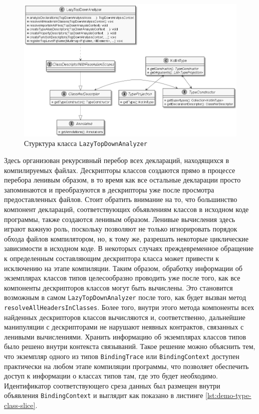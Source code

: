 \begin{figure}[htbp]
    \centering
    \includegraphics[width=\textwidth]{resources/06/12_class_descriptor.png}
    \caption{Стурктура класса \lstinline{LazyTopDownAnalyzer}}
    \label{fig:lazy-top-down-analyzer}
\end{figure}

Здесь организован рекурсивный перебор всех деклараций, находящихся в компилируемых файлах. Дескрипторы классов создаются прямо в процессе перебора ленивым образом, в то время как все остальные декларации просто запоминаются и преобразуются в дескрипторы уже после просмотра предоставленных файлов. Стоит обратить внимание на то, что большинство компонент деклараций, соответствующих объявлениям классов в исходном коде программы, также создаются ленивым образом. Ленивые вычисления здесь играют важную роль, поскольку позволяют не только игнорировать порядок обхода файлов компилятором, но, к тому же, разрешать некоторые циклические зависимости в исходном коде. В некоторых случаях преждевременное обращение к определенным составляющим дескриптора класса может привести к исключению на этапе компиляции. Таким образом, обработку информации об экземплярах классов типов целесообразно проводить уже после того, как все компоненты дескрипторов классов могут быть вычислены. Это становится возможным в самом \lstinline{LazyTopDownAnalyzer} после того, как будет вызван метод \lstinline{resolveAllHeadersInClasses}. Более того, внутри этого метода компоненты всех найденных дескрипторов классов вычисляются и, соответственно, дальнейшие манипуляции с дескрипторами не нарушают неявных контрактов, связанных с ленивыми вычислениями. Хранить информацию об экземплярах классов типов было решено внутри контекста связываний. Такое решение можно объяснить тем, что экземпляр одного из типов \lstinline{BindingTrace} или \lstinline{BindingContext} доступен практически на любом этапе компиляции программы, что позволяет обеспечить доступ к информации о классах типов там, где это будет необходимо. Идентификатор соответствующего среза данных был размещен внутри объявления \lstinline{BindingContext} и выглядит как показано в листинге \ref{lst:demo-type-class-slice}.

